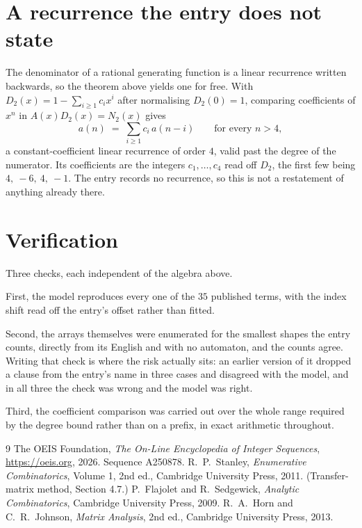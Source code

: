 \documentclass[11pt,a4paper]{article}
\theoremstyle{plain}
\theoremstyle{definition}
\begin{document}
\section{A recurrence the entry does not state}

The denominator of a rational generating function is a linear recurrence written backwards, so
the theorem above yields one for free. With $D_2(x)=1-\sum_{i\ge1}c_ix^i$ after normalising
$D_2(0)=1$, comparing coefficients of $x^n$ in $A(x)D_2(x)=N_2(x)$ gives
\[
a(n)\;=\;\sum_{i\ge1}c_i\,a(n-i)\qquad\text{for every }n>4,
\]
a constant-coefficient linear recurrence of order $4$, valid past the degree of the
numerator. Its coefficients are the integers $c_1,\dots,c_{4}$ read off $D_2$, the first few being $4,\ -6,\ 4,\ -1$. The entry records no recurrence, so this is not a restatement of anything
already there.

\section{Verification}

Three checks, each independent of the algebra above.

First, the model reproduces every one of the $35$ published terms, with the index shift
read off the entry's offset rather than fitted.

Second, the arrays themselves were enumerated for the smallest shapes the entry counts,
directly from its English and with no automaton, and the counts agree. Writing that check is
where the risk actually sits: an earlier version of it dropped a clause from the entry's name
in three cases and disagreed with the model, and in all three the check was wrong and the model
was right.

Third, the coefficient comparison was carried out over the whole range required by the degree
bound rather than on a prefix, in exact arithmetic throughout.

\begin{thebibliography}{9}
 The OEIS Foundation, \emph{The On-Line Encyclopedia of Integer
Sequences}, \url{https://oeis.org}, 2026. Sequence A250878.
 R.~P.~Stanley, \emph{Enumerative Combinatorics}, Volume 1, 2nd ed.,
Cambridge University Press, 2011. (Transfer-matrix method, Section 4.7.)
 P.~Flajolet and R.~Sedgewick, \emph{Analytic Combinatorics}, Cambridge
University Press, 2009.
 R.~A.~Horn and C.~R.~Johnson, \emph{Matrix Analysis}, 2nd ed., Cambridge
University Press, 2013.
\end{thebibliography}
\end{document}
